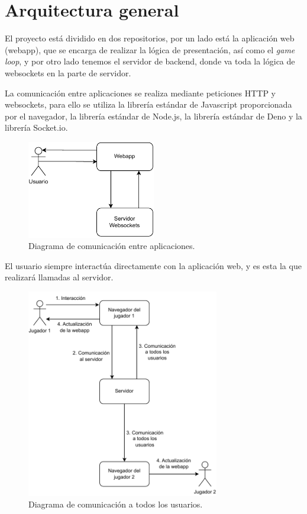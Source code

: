 \section{Arquitectura general}
El proyecto está dividido en dos repositorios, por un lado está la aplicación web (webapp), que se encarga de realizar la lógica de presentación, así como el \textit{game loop}, y por otro lado tenemos el servidor de backend, donde va toda la lógica de websockets en la parte de servidor.

La comunicación entre aplicaciones se realiza mediante peticiones HTTP y websockets, para ello se utiliza la librería estándar de Javascript proporcionada por el navegador, la librería estándar de Node.js, la librería estándar de Deno y la librería Socket.io.

\begin{figure}[H]
	\centering
	\includegraphics[clip=true,width=0.5\textwidth]{./diagrams/general_arch.pdf}
	\caption{Diagrama de comunicación entre aplicaciones.}
	\label{fig:ex_app_comms}
\end{figure}

El usuario siempre interactúa directamente con la aplicación web, y es esta la que realizará llamadas al servidor.

\begin{figure}[H]
	\centering
	\includegraphics[clip=true,width=0.75\textwidth]{./diagrams/overall_communications.pdf}
	\caption{Diagrama de comunicación a todos los usuarios.}
	\label{fig:ex_comms}
\end{figure}

